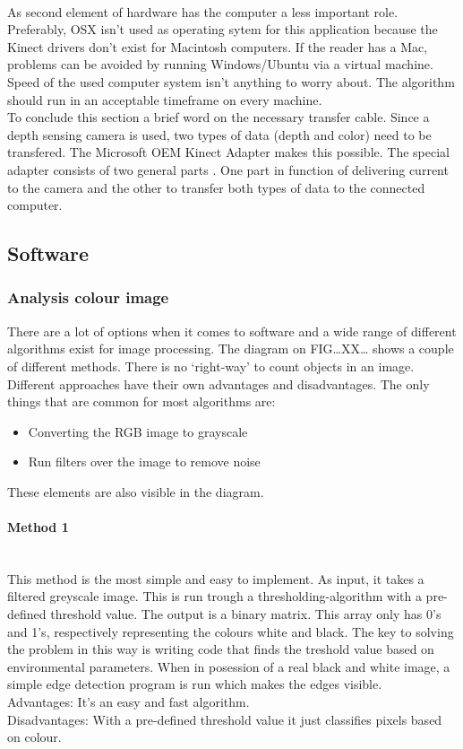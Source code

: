 \documentclass[11pt]{article}
\begin{document}
\\ As second element of hardware has the computer a less important role. Preferably, OSX isn't used as operating sytem for this application because the Kinect drivers don't exist for Macintosh computers. If the reader has a Mac, problems can be avoided by running Windows/Ubuntu via a virtual machine. Speed of the used computer system isn't anything to worry about. The algorithm should run in an acceptable timeframe on every machine.\\ To conclude this section a brief word on the necessary transfer cable. Since a depth sensing camera is used, two types of data (depth and color) need to be transfered. The Microsoft OEM Kinect Adapter makes this possible. The special adapter consists of two general parts . One part in function of delivering current to the camera and the other to transfer both types of data to the connected computer. 

\subsection{Software}
\subsubsection{Analysis colour image }
There are a lot of options when it comes to software and a wide range of different algorithms exist for image processing. The diagram on FIG…XX… shows a couple of different methods. There is no ‘right-way’ to count objects in an image. Different approaches have their own advantages and disadvantages. The only things that are common for most algorithms are:
\begin{itemize}
\item Converting the RGB image to grayscale
\item Run filters over the image to remove noise
\end{itemize}
These elements are also visible in the diagram.
\paragraph{Method 1}\mbox{}\\
This method is the most simple and easy to implement. As input, it takes a filtered greyscale image. This is run trough a thresholding-algorithm with a pre-defined threshold value. The output is a binary matrix. This array only has 0's and 1's, respectively representing the colours white and black. The key to solving the problem in this way is writing code that finds the treshold value based on environmental parameters. When in posession of a real black and white image, a simple edge detection program is run which makes the edges visible. 
\\Advantages: It’s an easy and fast algorithm.
\\Disadvantages: With a pre-defined threshold value it just classifies pixels based on colour. 
\end{document}
